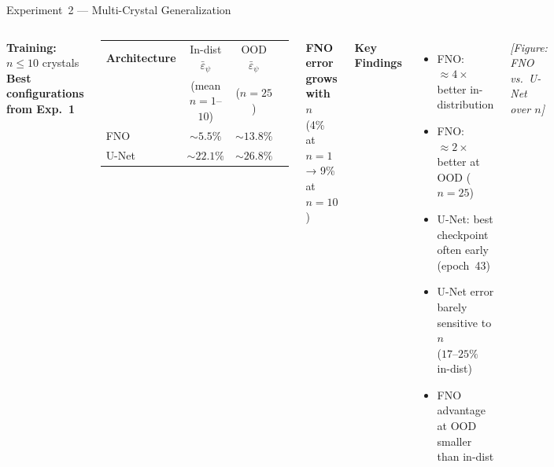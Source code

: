 \documentclass[aspectratio=169, 10pt]{beamer}
\begin{document}
\begin{frame}{Experiment~2 — Multi-Crystal Generalization}
  \begin{columns}[T]
      \textbf{Training:} $n \leq 10$ crystals\\
      \textbf{Best configurations from Exp.~1}

      \vspace{0.5em}
      \begin{center}
      \small
      \begin{tabular}{lccc}
        \toprule
        \textbf{Architecture} & In-dist $\bar{\varepsilon}_\psi$ & OOD $\bar{\varepsilon}_\psi$\\
                               & (mean $n=1$–$10$) & ($n=25$) \\
        \midrule
        \textcolor{fnocolor}{FNO}    & ${\sim}5.5\%$ & ${\sim}13.8\%$ \\
        \textcolor{unetcolor}{U-Net} & ${\sim}22.1\%$ & ${\sim}26.8\%$ \\
        \bottomrule
      \end{tabular}
      \end{center}

      \vspace{0.5em}
      \textbf{FNO error grows with $n$}\\
      \small (4\% at $n=1$ → 9\% at $n=10$)

      \textbf{Key Findings}
      \begin{itemize}
        \item FNO: ${\approx}4\times$ better in-distribution
        \item FNO: ${\approx}2\times$ better at OOD ($n=25$)
        \item U-Net: best checkpoint often early (epoch~43)
        \item U-Net error barely sensitive to $n$\\
          ($17$–$25\%$ in-dist)
        \item FNO advantage at OOD smaller than in-dist
      \end{itemize}

      \vspace{0.4em}
      \begin{center}
        \small\textit{[Figure: FNO vs.\ U-Net over $n$]}\\
      \end{center}
  \end{columns}
\end{frame}
\end{document}
